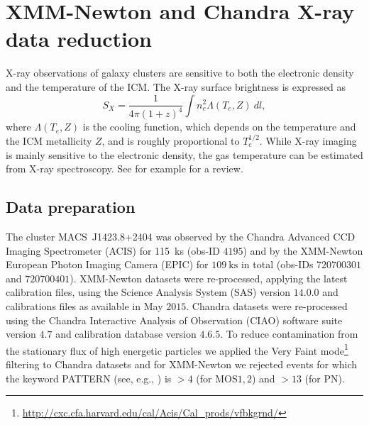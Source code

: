 \documentclass[twocolumn,traditabstract]{aa}
\begin{document}
\section{XMM-Newton and Chandra X-ray data reduction}\label{sec:XMM_Newton_and_Chandra_X_ray_data_reduction}
X-ray observations of galaxy clusters are sensitive to both the electronic density and the temperature of the ICM. The X-ray surface brightness is expressed as 
\begin{equation}
	S_X = \frac{1}{4 \pi \left(1+z\right)^4} \int n_e^2 \Lambda(T_e, Z) \ dl,
	\label{eq:sx}
\end{equation}
where $\Lambda(T_e,Z)$ is the cooling function, which depends on the temperature and the ICM metallicity $Z$, and is roughly proportional to $T_e^{1/2}$. While X-ray imaging is mainly sensitive to the electronic density, the gas temperature can be estimated from X-ray spectroscopy. See for example \cite{bohringer2010} for a review.

\subsection{Data preparation}
The cluster \mbox{MACS~J1423.8+2404} was observed by the Chandra Advanced CCD Imaging Spectrometer (ACIS) for \SI{115}{\kilo\second} (obs-ID $4195$) and by the XMM-Newton European Photon Imaging Camera (EPIC) for $\SI{109}{\kilo\second}$ in total (obs-IDs $720700301$ and $720700401$). XMM-Newton datasets were re-processed, applying the latest calibration files, using the Science Analysis System (SAS) version $14.0.0$ and calibrations files as available in May $2015$. Chandra datasets were re-processed using the Chandra Interactive Analysis of Observation (CIAO) software suite version $4.7$ and calibration database version $4.6.5$. To reduce contamination from the stationary flux of high energetic particles we applied the Very Faint mode\footnote{\label{fn1}\url{http://cxc.cfa.harvard.edu/cal/Acis/Cal\_prods/vfbkgrnd/}} filtering to Chandra datasets and for XMM-Newton we rejected events for which the keyword PATTERN (see, e.g., \citealt{pratt2007}) is $> 4$ (for MOS$1,2$) and $>13$ (for PN).
\end{document}
